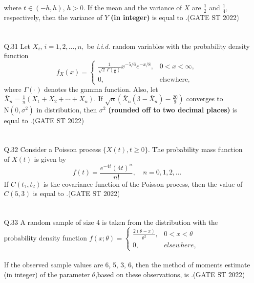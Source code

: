 \documentclass[journal,12pt,onecolumn]{IEEEtran}
\theoremstyle{remark}
\begin{document}
where $t \in (-h,h),\, h > 0$. If the mean and the variance of $X$ are $\frac{1}{2}$ and $\frac{1}{4}$, respectively, then the variance of $Y$ \textbf{(in integer)} is equal to \underline{\hspace{2cm}}.\hfill (GATE ST 2022)\\
\\
\\
Q.31 Let $X_i, \, i = 1, 2, \ldots, n,$ be \textit{i.i.d.} random variables with the probability density function
\[
f_X(x) = 
\begin{cases} 
	\frac{1}{\sqrt{2}\,\Gamma\left(\frac{1}{6}\right)} x^{-5/6} e^{-x/8}, & 0 < x < \infty, \\
	0, & \text{elsewhere},
\end{cases}
\]
where $\Gamma(\cdot)$ denotes the gamma function. Also, let $\overline{X}_n = \frac{1}{n}(X_1 + X_2 + \cdots + X_n)$. If
$
\sqrt{n} \left( \overline{X}_n \left(3 - \overline{X}_n \right) - \frac{20}{9} \right)
$
converges to $\mathrm{N}(0, \sigma^2)$ in distribution, then $\sigma^2$ \textbf{(rounded off to two decimal places)} is equal to \underline{\hspace{2cm}} .\hfill (GATE ST 2022)\\
\\
\\
Q.32 Consider a Poisson process $\{X(t), t \geq 0\}$. The probability mass function of $X(t)$ is given by
\[
f(t) = \frac{e^{-4t} (4t)^n}{n!}, \quad n=0,1,2,\dots
\]
If $C(t_1,t_2)$ is the covariance function of the Poisson process, then the value of $C(5,3)$ is equal to \underline{\hspace{2cm}}.\hfill (GATE ST 2022)\\
\\
\\
Q.33 A random sample of size 4 is taken from the distribution with the probability density
function $
f(x; \theta) = \begin{cases}
	\frac{2(\theta - x)}{\theta^2}, & 0 < x < \theta \\
	0, & elsewhere,
\end{cases}
$
\\
\\
If the observed sample values are 6, 5, 3, 6, then the method of moments estimate (in integer) of the parameter $\theta$,based on these observations, is \underline{\hspace{2cm}}.\hfill (GATE ST 2022)\\
\\
\\
\end{document}
